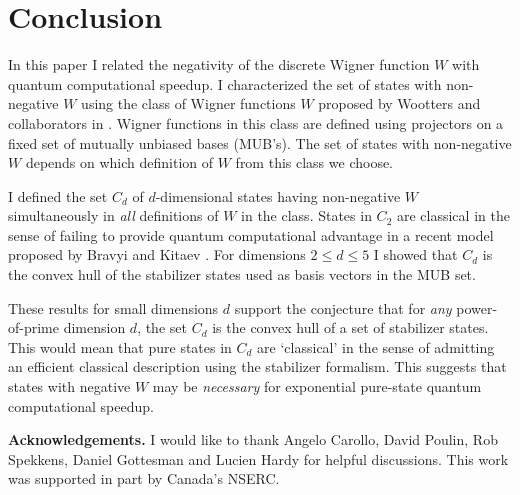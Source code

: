\documentclass[aps,twocolumn,showpacs,nofootinbib,groupedaddress]{revtex4}
\begin{document}
\section{Conclusion}

In this paper I related the negativity of the discrete Wigner
function $W$ with quantum computational speedup. I characterized
the set of states with non-negative $W$ using the class of Wigner
functions $W$ proposed by Wootters and collaborators in
\cite{Wootters04,GibbonsHW04}. Wigner functions in this class are
defined using projectors on a fixed set of mutually unbiased bases
(MUB's). The set of states with non-negative $W$ depends on which
definition of $W$ from this class we choose.

I defined the set $C_d$ of $d$-dimensional states having
non-negative $W$ simultaneously in \textit{all} definitions of $W$
in the class. States in $C_2$ are classical in the sense of
failing to provide quantum computational advantage in a recent
model proposed by Bravyi and Kitaev \cite{BravyiK04}. For
dimensions $2 \le d \le 5$ I showed that $C_d$ is the convex hull
of the stabilizer states used as basis vectors in the MUB set.

These results for small dimensions $d$ support the conjecture that
for \textit{any} power-of-prime dimension $d$, the set $C_d$ is
the convex hull of a set of stabilizer states. This would mean
that pure states in $C_d$ are `classical' in the sense of
admitting an efficient classical description using the stabilizer
formalism. This suggests that states with negative $W$ may be
\textit{necessary} for exponential pure-state quantum
computational speedup.

\textbf{Acknowledgements.} I would like to thank Angelo Carollo,
David Poulin, Rob Spekkens, Daniel Gottesman and Lucien Hardy for
helpful discussions. This work was supported in part by Canada's
NSERC.
\end{document}
